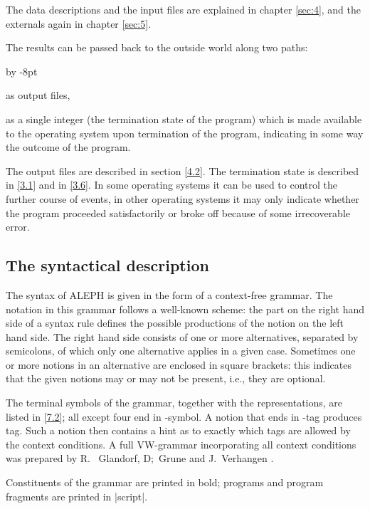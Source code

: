\documentclass{article}
\newcommand\g[1]{{\sf #1}}
\renewenvironment{itemize}{\begin{list}{}{%
\advance\leftmargin by -8pt%
\setlength\itemsep{0ex plus 0.2ex}%
\setlength\partopsep{3pt}%
\setlength\topsep{2pt plus 2pt}%
\setlength\parsep{0pt plus 2pt}%
}}{\end{list}}
\let\oref\ref
\let\ref\oref
\newcommand\A{{\sf ALEPH}}
\begin{document}
The data descriptions and the input files are explained in chapter
\ref{sec:4}, and the
externals again in chapter \ref{sec:5}.

The results can be passed back to the outside world along two paths:
\begin{itemize}
\item[a.] as output files,
\item[b.] as a single integer (the termination state of the program) which is
made available to the operating system upon termination of the program, indicating
in some way the outcome of the program.
\end{itemize}

The output files are described in section \ref{4.2}. The termination state is
described in \ref{3.1} and in \ref{3.6}. In some operating systems it can be used to
control the further course of events, in other operating systems it may only
indicate whether the program proceeded satisfactorily or broke off because
of some irrecoverable error.

\subsection{The syntactical description}\label{2.2}

The syntax of \A{} is given in the form of a context-free grammar. The
notation in this grammar follows a well-known scheme: the part on the right
hand side of a syntax rule defines the possible productions of the notion on
the left hand side. The right hand side consists of one or more
alternatives, separated by semicolons, of which only one alternative applies
in a given case. Sometimes one or more notions in an alternative are
enclosed in square brackets: this indicates that the given notions may or
may not be present, i.e., they are optional.

The terminal symbols of the grammar, together with the representations, are
listed in \ref{7.2}; all except four end in \g{-symbol}. A notion that ends
in \g{-tag} produces \g{tag}. Such a notion then contains a hint as to
exactly which \g{tag}s are allowed by the context conditions. A full
VW-grammar incorporating all context conditions was prepared by R.~
Glandorf, D;~Grune and J.~Verhangen \cite{GGV78}.

Constituents of the grammar are printed in \g{bold}; programs and program
fragments are printed in \pp|script|.

\newpage
\end{document}
